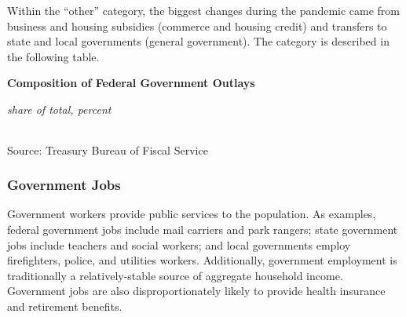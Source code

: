 \documentclass{report}
\begin{document}
{\begin{minipage}{0.76\textwidth}


\end{minipage}
\newpage
\begin{minipage}{0.76\textwidth}  
\small 

Within the ``other'' category, the biggest changes during the pandemic came from business and housing subsidies (commerce and housing credit) and transfers to state and local governments (general government). The category is described in the following table. 
\vspace{2mm}

\normalsize \textbf{Composition of Federal Government Outlays}\\
\footnotesize{\textit{share of total, percent}\\
 \setlength{\tabcolsep}{1.2pt} \color{black!90}
{\renewcommand{\arraystretch}{1.55}
\hspace*{-2mm} \begin{tabular}{p{58mm} R{9.0mm} R{9.0mm} R{9.0mm} R{9.0mm} R{9.0mm} R{9.0mm}}
		 \hline
	\end{tabular}
}}
		
\vspace{-2mm}
\footnotesize{Source: Treasury Bureau of Fiscal Service}
\end{minipage}
\newpage
\begin{minipage}{0.76\textwidth}
\subsubsection*{Government Jobs}
 
\small Government workers provide public services to the population. As examples, federal government jobs include mail carriers and park rangers; state government jobs include teachers and social workers; and local governments employ firefighters, police, and utilities workers. Additionally, government employment is traditionally a relatively-stable source of aggregate household income. Government jobs are also disproportionately likely to provide health insurance and retirement benefits.  
\end{minipage}
\vspace{1mm}

}
\end{document}
